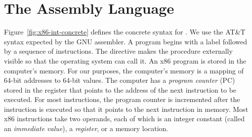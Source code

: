 \documentclass[7x10]{TimesAPriori_MIT}%
\numberwithin{theorem}{chapter}
\numberwithin{definition}{chapter}
\numberwithin{equation}{chapter}
\begin{document}
\section{The \LangXInt{} Assembly Language}
\label{sec:x86}

Figure~\ref{fig:x86-int-concrete} defines the concrete syntax for
\LangXInt{}.  We use the AT\&T syntax expected by the GNU
assembler.
%
A program begins with a  label followed by a sequence of
instructions. The  directive makes the  procedure
externally visible so that the operating system can call it.
%
An x86 program is stored in the computer's memory.  For our purposes,
the computer's memory is a mapping of 64-bit addresses to 64-bit
values.  The computer has a \emph{program counter}
(PC) stored in the
 register that points to the address of the next instruction
to be executed.  For most instructions, the program counter is
incremented after the instruction is executed so that it points to the
next instruction in memory. Most x86 instructions take two operands,
each of which is an integer constant (called an \emph{immediate
  value}), a
\emph{register}, or a memory location.

\newcommand{\allregisters}{\key{rsp} \MID \key{rbp} \MID \key{rax} \MID \key{rbx} \MID \key{rcx}
              \MID \key{rdx} \MID \key{rsi} \MID \key{rdi} \MID \\
              && \key{r8} \MID \key{r9} \MID \key{r10}
              \MID \key{r11} \MID \key{r12} \MID \key{r13}
              \MID \key{r14} \MID \key{r15}}

\newcommand{\GrammarXInt}{
\begin{array}{rcl}
\Reg &::=& \allregisters{} \\
\Arg &::=&  \key{\$}\Int \MID \key{\%}\Reg \MID \Int\key{(}\key{\%}\Reg\key{)}\\
\Instr &::=& \key{addq} \; \Arg\key{,} \Arg \MID
      \key{subq} \; \Arg\key{,} \Arg \MID
      \key{negq} \; \Arg \MID \key{movq} \; \Arg\key{,} \Arg \MID \\
  &&  \key{pushq}\;\Arg \MID \key{popq}\;\Arg \MID 
      \key{callq} \; \mathit{label} \MID
      \key{retq} \MID
      \key{jmp}\,\itm{label} \MID \\
  && \itm{label}\key{:}\; \Instr 
\end{array}
}
\end{document}
